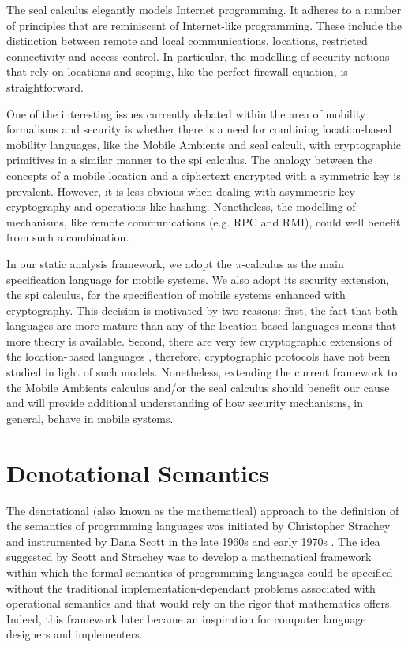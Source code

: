 \documentclass[10pt,a4paper,final,oneside,fleqn]{book}
\begin{document}
The seal calculus elegantly models Internet programming.  It adheres to a number of principles that are reminiscent of Internet-like programming.  These include the distinction between remote and local communications, locations, restricted connectivity and access control.  In particular, the modelling of security notions that rely on locations and scoping, like the perfect firewall equation, is straightforward.

One of the interesting issues currently debated within the area of mobility formalisms and security is whether there is a need for combining location-based mobility languages, like the Mobile Ambients and seal calculi, with cryptographic primitives in a similar manner to the spi calculus.  The analogy between the concepts of a mobile location and a ciphertext encrypted with a symmetric key is prevalent.  However, it is less obvious when dealing with asymmetric-key cryptography and operations like hashing.  Nonetheless, the modelling of mechanisms, like remote communications (e.g. RPC and RMI), could well benefit from such a combination.

In our static analysis framework, we adopt the $\pi$-calculus as the main specification language for mobile systems.  We also adopt its security extension, the spi calculus, for the specification of mobile systems enhanced with cryptography.  This decision is motivated by two reasons: first, the fact that both languages are more mature than any of the location-based languages means that more theory is available.  Second, there are very few cryptographic extensions of the location-based languages \cite{prelic1}, therefore, cryptographic protocols have not been studied in light of such models. Nonetheless, extending the current framework to the Mobile Ambients calculus and/or the seal calculus should benefit our cause and will provide additional understanding of how security mechanisms, in general, behave in mobile systems.
\section{Denotational Semantics}
The denotational (also known as the mathematical) approach to the definition of the semantics of programming languages was initiated by Christopher Strachey and instrumented by Dana Scott in the late 1960s and early 1970s \cite{scott1,scott2,strachey1,schmidt1,stoy1,winskel1}.  The idea suggested by Scott and Strachey was to develop a mathematical framework within which the formal semantics of programming languages could be specified without the traditional implementation-dependant problems associated with operational semantics and that would rely on the rigor that mathematics offers.  Indeed, this framework later became an inspiration for computer language designers and implementers.
\end{document}
